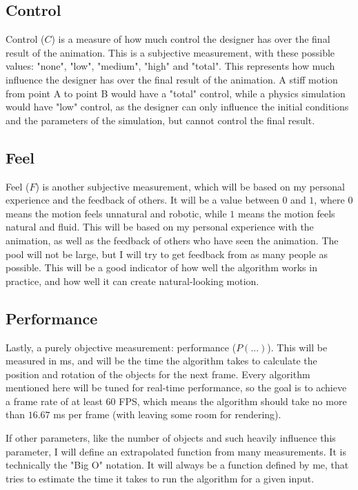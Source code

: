 \subsection{Control}
\label{subsec:control}

Control (\({C}\)) is a measure of how much control the designer has over the final result of the animation. This is a subjective measurement, with these possible values: "none", "low", "medium", "high" and "total". This represents how much influence the designer has over the final result of the animation. A stiff motion from point A to point B would have a "total" control, while a physics simulation would have "low" control, as the designer can only influence the initial conditions and the parameters of the simulation, but cannot control the final result.

\pagebreak

\subsection{Feel}
\label{subsec:feel}

Feel (\(F\)) is another subjective measurement, which will be based on my personal experience and the feedback of others. It will be a value between \(0\) and \(1\), where \(0\) means the motion feels unnatural and robotic, while \(1\) means the motion feels natural and fluid. This will be based on my personal experience with the animation, as well as the feedback of others who have seen the animation. The pool will not be large, but I will try to get feedback from as many people as possible. This will be a good indicator of how well the algorithm works in practice, and how well it can create natural-looking motion.

\subsection{Performance}
\label{subsec:performance}

Lastly, a purely objective measurement: performance (\(P(...)\)). This will be measured in ms, and will be the time the algorithm takes to calculate the position and rotation of the objects for the next frame. Every algorithm mentioned here will be tuned for real-time performance, so the goal is to achieve a frame rate of at least \(60\) FPS, which means the algorithm should take no more than \(16.67\) ms per frame (with leaving some room for rendering). 

If other parameters, like the number of objects and such heavily influence this parameter, I will define an extrapolated function from many measurements. It is technically the "Big O" notation. It will always be a function defined by me, that tries to estimate the time it takes to run the algorithm for a given input.


